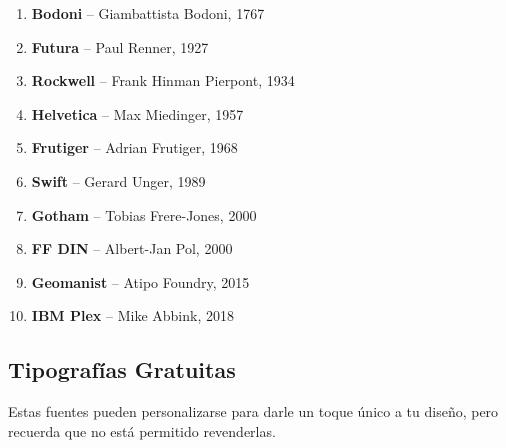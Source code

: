 \documentclass[
  jou,
  floatsintext,
  longtable,
  a4paper,
  nolmodern,
  notxfonts,
  notimes,
  12pt,
  colorlinks=true,linkcolor=blue,citecolor=blue,urlcolor=blue]{apa7}
\providecommand{\tightlist}{%
  \setlength{\itemsep}{0pt}\setlength{\parskip}{0pt}}
\begin{document}
\begin{enumerate}
\def\labelenumi{\arabic{enumi}.}
\tightlist
\item
  \textbf{Bodoni} -- Giambattista Bodoni, 1767\\
\item
  \textbf{Futura} -- Paul Renner, 1927\\
\item
  \textbf{Rockwell} -- Frank Hinman Pierpont, 1934\\
\item
  \textbf{Helvetica} -- Max Miedinger, 1957\\
\item
  \textbf{Frutiger} -- Adrian Frutiger, 1968\\
\item
  \textbf{Swift} -- Gerard Unger, 1989\\
\item
  \textbf{Gotham} -- Tobias Frere-Jones, 2000\\
\item
  \textbf{FF DIN} -- Albert-Jan Pol, 2000\\
\item
  \textbf{Geomanist} -- Atipo Foundry, 2015
\item
  \textbf{IBM Plex} -- Mike Abbink, 2018
\end{enumerate}

\subsection{Tipografías Gratuitas}\label{tipografuxedas-gratuitas}

Estas fuentes pueden personalizarse para darle un toque único a tu
diseño, pero recuerda que no está permitido revenderlas.
\end{document}
